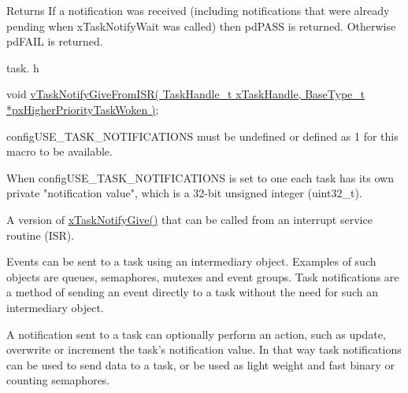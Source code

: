 \begin{DoxyReturn}{Returns}
If a notification was received (including notifications that were already pending when x\+Task\+Notify\+Wait was called) then pd\+P\+A\+SS is returned. Otherwise pd\+F\+A\+IL is returned.
\end{DoxyReturn}
task. h 
\begin{DoxyPre}void \hyperlink{vendor_2ceedling_2plugins_2freertos_2src_2freertos_2include_2task_8h_a4a4bcf98ad282a596e13f3f30582a11b}{vTaskNotifyGiveFromISR( TaskHandle\_t xTaskHandle, BaseType\_t *pxHigherPriorityTaskWoken )};\end{DoxyPre}



\begin{DoxyPre}configUSE\_TASK\_NOTIFICATIONS must be undefined or defined as 1 for this macro
to be available.\end{DoxyPre}



\begin{DoxyPre}When configUSE\_TASK\_NOTIFICATIONS is set to one each task has its own private
"notification value", which is a 32-bit unsigned integer (uint32\_t).\end{DoxyPre}



\begin{DoxyPre}A version of \hyperlink{vendor_2ceedling_2plugins_2freertos_2src_2freertos_2include_2task_8h_ac60cbd05577a3e4f3c3587dd9b213930}{xTaskNotifyGive()} that can be called from an interrupt service
routine (ISR).\end{DoxyPre}



\begin{DoxyPre}Events can be sent to a task using an intermediary object.  Examples of such
objects are queues, semaphores, mutexes and event groups.  Task notifications
are a method of sending an event directly to a task without the need for such
an intermediary object.\end{DoxyPre}



\begin{DoxyPre}A notification sent to a task can optionally perform an action, such as
update, overwrite or increment the task's notification value.  In that way
task notifications can be used to send data to a task, or be used as light
weight and fast binary or counting semaphores.\end{DoxyPre}



